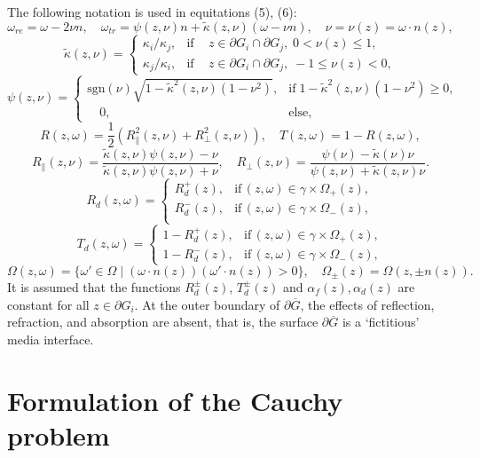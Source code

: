 \documentclass[12pt,reqno]{report}
\def\sgn{\mathrm{sgn}}
\begin{document}
The following notation is used in equitations (5), (6): 
$$
\omega_{re} =\omega -2 \nu n, \quad \omega_{tr} =\psi (z,\nu) n +
\widetilde{\kappa}(z,\nu)( \omega - \nu n),   \quad
\nu=\nu(z)=\omega \cdot n(z),
$$
$$
 \widetilde{\kappa}(z,\nu) =
  \begin{cases}
 {\kappa_i}/{\kappa_j}, & \text{if} \,    \quad z \in \partial G_i \cap \partial G_j, \;   0<     \nu(z) \leq 1, \\
 {\kappa_j}/{\kappa_i}, & \text{if} \,    \quad z \in \partial G_i \cap \partial G_j, \;   -1 \leq \nu(z)  <
 0,
  \end{cases}
$$
$$
\psi(z,\nu)=
 \begin{cases}
 {\sgn}(\nu) \sqrt{1- \widetilde{\kappa}^2(z,\nu) (1-\nu^2)}, & \text{if}
\;      1- \widetilde{\kappa}^2(z,\nu) (1-\nu^2) \geq 0, \\
\quad  0,     &  \text{else},
  \end{cases}
$$
$$
R (z,\omega)=\frac{1}{2} (R^2_{\|}(z,\nu)+R^2_{\bot}(z,\nu)),
\quad
T(z,\omega)= 
    1-R(z,\omega),
$$
$$
R_{\|}(z,\nu)=\frac{\widetilde{\kappa}(z,\nu)
\psi(z,\nu)-\nu}{\widetilde{\kappa}(z,\nu) \psi(z,\nu)+\nu},\quad
R_{\bot}(z,\nu)=\frac{\psi(\nu)-\widetilde{\kappa}(\nu)\nu}
{\psi(z,\nu)+\widetilde{\kappa}(z,\nu)\nu}.
$$
$$
 R_d(z,\omega) =
  \begin{cases}
 R^+_d(z), & \text{if} \,     (z,\omega) \in \gamma \times \Omega_+(z), \\
 R^-_d(z), & \text{if} \,     (z,\omega) \in \gamma \times  \Omega_-(z), \\
  \end{cases}
$$
$$
 T_d(z,\omega) =
  \begin{cases}
 1-R^+_d(z), & \text{if} \,     (z,\omega) \in \gamma \times \Omega_+(z), \\
 1-R^-_d(z), & \text{if} \,      (z,\omega) \in \gamma \times \Omega_-(z),
  \end{cases}
$$
$$
\Omega(z,\omega) =\{\omega' \in \Omega \; |\;  ( \omega
\cdot n(z))(\omega' \cdot n(z))>0 \}, \quad
\Omega_{\pm}(z)=\Omega(z,\pm n(z)).
$$
It is assumed that the functions $R_{d}^{\pm}(z)$, $T_{d}^{\pm}(z)$ and $\alpha_f(z), \alpha_d(z) $ are constant for all $z \in \partial G_i $.
At the outer boundary of $ \partial\overline{G} $, the effects of reflection, refraction, and absorption are absent, that is, the surface $ \partial\overline {G} $ is a `fictitious' media interface.
\section{Formulation of the Cauchy problem}
\end{document}
